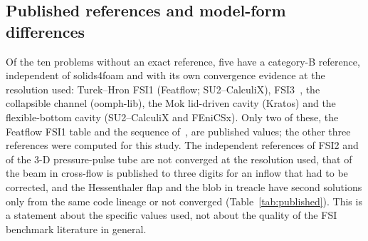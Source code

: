 \subsection{Published references and model-form differences}\label{sec:published_reliability}

Of the ten problems without an exact reference, five have a category-B reference, independent of solids4foam and with its own convergence evidence at the resolution used: Turek--Hron FSI1 (Featflow; SU2--CalculiX), FSI3~\citep{Failer2020}, the collapsible channel (oomph-lib), the Mok lid-driven cavity (Kratos) and the flexible-bottom cavity (SU2--CalculiX and FEniCSx).
Only two of these, the Featflow FSI1 table and the sequence of~\citet{Failer2020}, are published values; the other three references were computed for this study.
The independent references of FSI2 and of the 3-D pressure-pulse tube are not converged at the resolution used, that of the beam in cross-flow is published to three digits for an inflow that had to be corrected, and the Hessenthaler flap and the blob in treacle have second solutions only from the same code lineage or not converged (Table~\ref{tab:published}).
This is a statement about the specific values used, not about the quality of the FSI benchmark literature in general.

